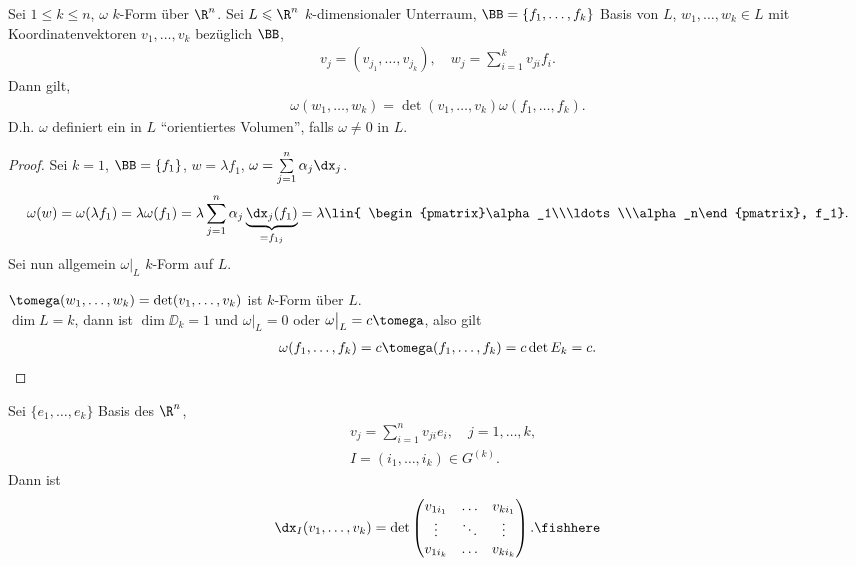 \begin{prop}
\label{prop:4.71}
Sei $1\le k\le n$, $\omega$ $k$-Form über $\R^n$. Sei $L\leqslant\R^n$
$k$-dimensionaler Unterraum, $\BB=\{f_1,\ldots,f_k\}$ Basis von $L$,
$w_1,\ldots,w_k\in L$ mit Koordinatenvektoren $v_1,\ldots,v_k$ bezüglich $\BB$,
\begin{align*}
v_j = (v_{j_1},\ldots,v_{j_k}),\quad w_j = \sum\limits_{i=1}^k v_{ji} f_i.
\end{align*}
Dann gilt,
\begin{align*}
\omega(w_1,\ldots,w_k) = \det(v_1,\ldots,v_k)\omega(f_1,\ldots,f_k).
\end{align*}
D.h. $\omega$ definiert ein in $L$ ``orientiertes Volumen'', falls $\omega\neq
0$ in $L$.\fishhere
\end{prop}
\begin{proof}
Sei $k=1$, $\BB=\{f_1\}$, $w = \lambda f_1$, $\omega = \sum\limits_{j=1}^n
\alpha_j \dx_j$.
\begin{align*}
\omega(w) = \omega(\lambda f_1) = \lambda\omega(f_1) =
\lambda\sum\limits_{j=1}^n \alpha_j \underbrace{\dx_j(f_1)}_{=f_{1j}} =
\lambda\lin{ \begin{pmatrix}\alpha_1\\\ldots\\\alpha_n\end{pmatrix}, f_1}.
\end{align*}
Sei nun allgemein $\omega\big|_L$ $k$-Form auf $L$.

$\tomega(w_1,\ldots,w_k) = \det(v_1,\ldots,v_k)$ ist $k$-Form über $L$.\\
$\dim L = k$, dann ist $\dim\DD_k = 1$ und $\omega\big|_L = 0$ oder $\omega\big|_L =
c\tomega$, also gilt
\begin{align*}
\omega(f_1,\ldots,f_k) = c\tomega(f_1,\ldots,f_k) = c\det E_k = c.\qedhere
\end{align*}
\end{proof}
\begin{cor}
\label{prop:4.72}
Sei $\{e_1,\ldots,e_k\}$ Basis des $\R^n$,
\begin{align*}
&v_j = \sum\limits_{i=1}^n v_{ji}e_i,\quad j=1,\ldots,k,\\
&I = (i_1,\ldots,i_k)\in G^{(k)}.
\end{align*}
Dann ist
\begin{align*}
\dx_I(v_1,\ldots,v_k) = \det\begin{pmatrix}
v_{1i_1} & \ldots & v_{ki_1}\\
\vdots & \ddots & \vdots\\
v_{1i_k} & \ldots & v_{ki_k}
\end{pmatrix}.\fishhere
\end{align*}
\end{cor}
